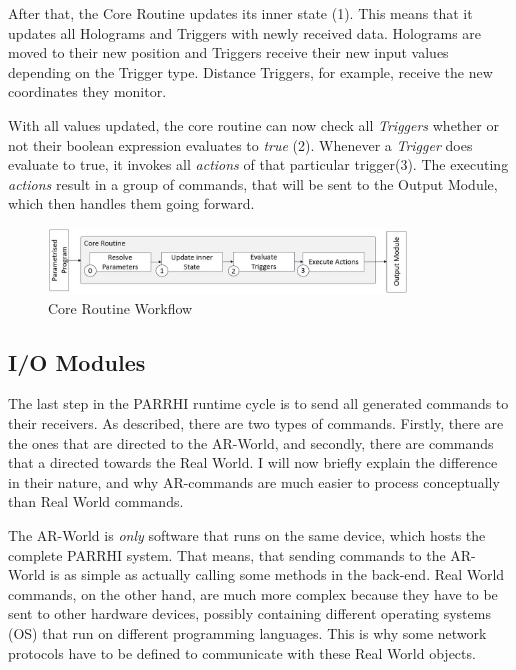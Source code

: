 After that, the Core Routine updates its inner state (1). This means that it updates all Holograms and Triggers with newly received data. Holograms are moved to their new position and Triggers receive their new input values depending on the Trigger type. Distance Triggers, for example, receive the new coordinates they monitor.

With all values updated, the core routine can now check all \textit{Triggers} whether or not their boolean expression evaluates to \textit{true} (2). Whenever a \textit{Trigger} does evaluate to true, it invokes all \textit{actions} of that particular trigger(3). The executing \textit{actions} result in a group of commands, that will be sent to the Output Module, which then handles them going forward. 

\begin{figure}[!h]
	\centering
	\includegraphics[width=0.85\textwidth]{Figures/CoreRoutine.jpg}
	\caption{Core Routine Workflow}
	\label{Fig:CoreRoutine}
\end{figure}

\subsection{I/O Modules}

The last step in the PARRHI runtime cycle is to send all generated commands to their receivers. As described, there are two types of commands. Firstly, there are the ones that are directed to the AR-World, and secondly, there are commands that a directed towards the Real World. I will now briefly explain the difference in their nature, and why AR-commands are much easier to process conceptually than Real World commands.

The AR-World is \textit{only} software that runs on the same device, which hosts the complete PARRHI system. That means, that sending commands to the AR-World is as simple as actually calling some methods in the back-end. Real World commands, on the other hand, are much more complex because they have to be sent to other hardware devices, possibly containing different operating systems (OS) that run on different programming languages. This is why some network protocols have to be defined to communicate with these Real World objects. 


